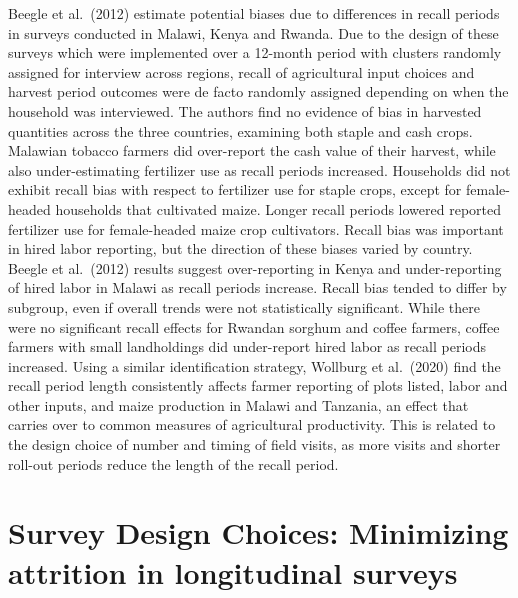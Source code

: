 \documentclass[
]{book}
\begin{document}
Beegle et al.~(2012) estimate potential biases due to differences in recall periods in surveys conducted in Malawi, Kenya and Rwanda. Due to the design of these surveys which were implemented over a 12-month period with clusters randomly assigned for interview across regions, recall of agricultural input choices and harvest period outcomes were de facto randomly assigned depending on when the household was interviewed. The authors find no evidence of bias in harvested quantities across the three countries, examining both staple and cash crops. Malawian tobacco farmers did over-report the cash value of their harvest, while also under-estimating fertilizer use as recall periods increased. Households did not exhibit recall bias with respect to fertilizer use for staple crops, except for female-headed households that cultivated maize. Longer recall periods lowered reported fertilizer use for female-headed maize crop cultivators. Recall bias was important in hired labor reporting, but the direction of these biases varied by country. Beegle et al.~(2012) results suggest over-reporting in Kenya and under-reporting of hired labor in Malawi as recall periods increase. Recall bias tended to differ by subgroup, even if overall trends were not statistically significant. While there were no significant recall effects for Rwandan sorghum and coffee farmers, coffee farmers with small landholdings did under-report hired labor as recall periods increased. Using a similar identification strategy, Wollburg et al.~(2020) find the recall period length consistently affects farmer reporting of plots listed, labor and other inputs, and maize production in Malawi and Tanzania, an effect that carries over to common measures of agricultural productivity. This is related to the design choice of number and timing of field visits, as more visits and shorter roll-out periods reduce the length of the recall period.

\hypertarget{survey-design-choices-minimizing-attrition-in-longitudinal-surveys}{%
\section{Survey Design Choices: Minimizing attrition in longitudinal surveys}\label{survey-design-choices-minimizing-attrition-in-longitudinal-surveys}}
\end{document}
